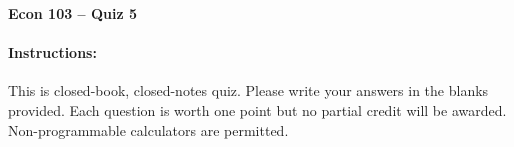 \documentclass[addpoints,10pt]{exam}
\begin{document}
\thispagestyle{empty}

\noindent \textbf{Econ 103 -- Quiz 5}

\vspace{15pt}
\noindent
{}\hfill 
\paragraph{Instructions: } This is closed-book, closed-notes quiz. Please write your answers in the blanks provided. Each question is worth one point but no partial credit will be awarded. Non-programmable calculators are permitted.

\vspace{5pt}

\setlength\answerlinelength{6in}
\end{document}
